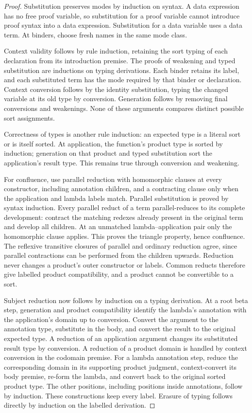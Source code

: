 \begin{proof}
Substitution preserves modes by induction on syntax.  A data expression has
no free proof variable, so substitution for a proof variable cannot introduce
proof syntax into a data expression.  Substitution for a data variable uses
a data term.  At binders, choose fresh names in the same mode class.

Context validity follows by rule induction, retaining the sort typing of
each declaration from its introduction premise.
The proofs of weakening and typed substitution are inductions on typing
derivations.  Each binder retains its label, and each substituted term has
the mode required by that binder or declaration.  Context conversion follows
by the identity substitution, typing the changed variable at its old type
by conversion.  Generation follows by removing final conversions and
weakenings.  None of these arguments compares distinct possible sort
assignments.

Correctness of types is another rule induction: an expected type is a literal
sort or is itself
sorted.  At application, the function's product type is sorted by induction;
generation on that product and typed substitution sort the application's
result type.  This remains true through conversion and weakening.

For confluence, use parallel reduction with homomorphic clauses at every
constructor, including annotation children, and a contracting clause only
when the application and lambda labels match.  Parallel substitution is
proved by syntax induction.  Every parallel reduct of a term parallel-reduces
to its complete development: contract the matching redexes already present
in the original term and develop all children.  At an unmatched
lambda--application pair only the homomorphic clause applies.  This proves
the triangle property, hence confluence.  The reflexive transitive closures
of parallel and ordinary reduction agree, since parallel contractions can be
performed from the children upwards.  Reduction never changes a product's
outer constructor or labels.  Common reducts therefore give labelled product
compatibility, and a product cannot be convertible to a sort.

Subject reduction now follows by induction on a typing derivation.  At a root
beta step, generation and product compatibility identify the lambda's
annotation with the application's domain up to conversion.  Convert the
argument to the annotation type, substitute in the body, and convert the
result to the original expected type.  A reduction of an application
argument changes its substituted result type by conversion.  A reduction
of a product domain is handled by context conversion in the codomain
premise.  For a lambda annotation step, reduce the corresponding domain in
its supporting product judgment, context-convert its body premise,
re-form the lambda, and convert back to the original sorted product type.
The other positions, including positions inside
annotations, follow by induction.  These constructions keep every label.
Erasure of typing follows directly by induction on the labelled derivation.


\end{proof}
